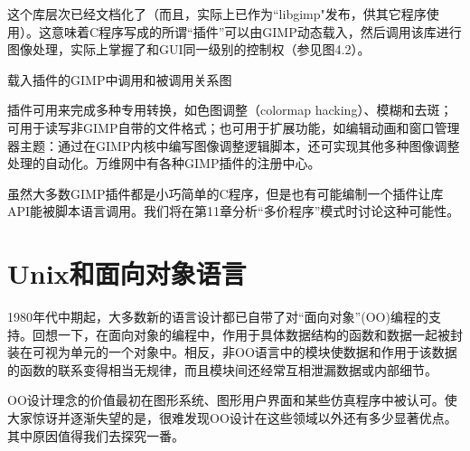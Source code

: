 \documentclass[11pt,oneside]{book}
\begin{document}
\begin{common-format}
这个库层次已经文档化了（而且，实际上已作为“libgimp"发布，供其它程序使用）。这意味着C程序写成的所谓“插件”可以由GIMP动态载入，然后调用该库进行图像处理，实际上掌握了和GUI同一级别的控制权（参见图4.2）。

\begin{fig}{载入插件的GIMP中调用和被调用关系图}
\label{fig:载入插件的GIMP中调用和被调用关系图}
\end{fig}

插件可用来完成多种专用转换，如色图调整（colormap hacking）、模糊和去斑；可用于读写非GIMP自带的文件格式；也可用于扩展功能，如编辑动画和窗口管理器主题：通过在GIMP内核中编写图像调整逻辑脚本，还可实现其他多种图像调整处理的自动化。万维网中有各种GIMP插件的注册中心。

虽然大多数GIMP插件都是小巧简单的C程序，但是也有可能编制一个插件让库API能被脚本语言调用。我们将在第11章分析“多价程序”模式时讨论这种可能性。


\section{Unix和面向对象语言}
1980年代中期起，大多数新的语言设计都已自带了对“面向对象”(OO)编程的支持。回想一下，在面向对象的编程中，作用于具体数据结构的函数和数据一起被封装在可视为单元的一个对象中。相反，非OO语言中的模块使数据和作用于该数据的函数的联系变得相当无规律，而且模块间还经常互相泄漏数据或内部细节。

OO设计理念的价值最初在图形系统、图形用户界面和某些仿真程序中被认可。使大家惊讶并逐渐失望的是，很难发现OO设计在这些领域以外还有多少显著优点。其中原因值得我们去探究一番。


\end{common-format}
\end{document}
